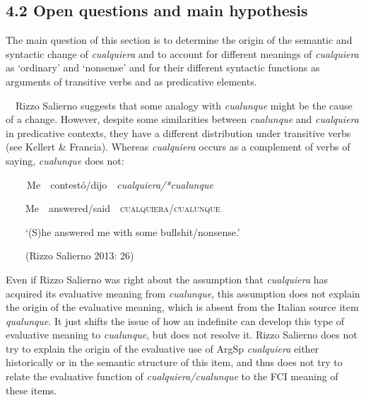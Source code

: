 \subsection[4.2 Open questions and main hypothesis]{\textbf{4.2 Open questions and main hypothesis}}
\begin{styleStandard}
The main question of this section is to determine the origin of the semantic and syntactic change of \textit{cualquiera} and to account for different meanings of \textit{cualquiera} as ‘ordinary’ and ‘nonsense’ and for their different syntactic functions as arguments of transitive verbs and as predicative elements.
\end{styleStandard}

\begin{styleStandard}
\ \ Rizzo Salierno suggests that some analogy with \textit{cualunque} might be the cause of a change. However, despite some similarities between \textit{cualunque} and \textit{cualquiera} in predicative contexts, they have a different distribution under transitive verbs (see Kellert \& Francia). Whereas \textit{cualquiera} occurs as a complement of verbs of saying, \textit{cualunque} does not:
\end{styleStandard}

\begin{styleStandard}
\textbf{\ \ }\ \ Me\ \ contestó/dijo\ \ \textit{cualquiera/*cualunque}
\end{styleStandard}

\begin{styleStandard}
\ \ \ \ Me\ \ answered/said\ \ \textsc{cualquiera/cualunque}
\end{styleStandard}

\begin{styleStandard}
\ \ \ \ ‘(S)he answered me with some bullshit/nonsense.’
\end{styleStandard}

\begin{styleStandard}
\ \ \ \ (Rizzo Salierno 2013: 26)
\end{styleStandard}

\begin{styleStandard}
Even if Rizzo Salierno was right about the assumption that \textit{cualquiera} has acquired its evaluative meaning from \textit{cualunque}, this assumption does not explain the origin of the evaluative meaning, which is absent from the Italian source item \textit{qualunque}. It just shifts the issue of how an indefinite can develop this type of evaluative meaning to \textit{cualunque}, but does not resolve it. Rizzo Salierno does not try to explain the origin of the evaluative use of ArgSp \textit{cualquiera} either historically or in the semantic structure of this item, and thus does not try to relate the evaluative function of \textit{cualquiera/cualunque} to the FCI meaning of these items. 
\end{styleStandard}

